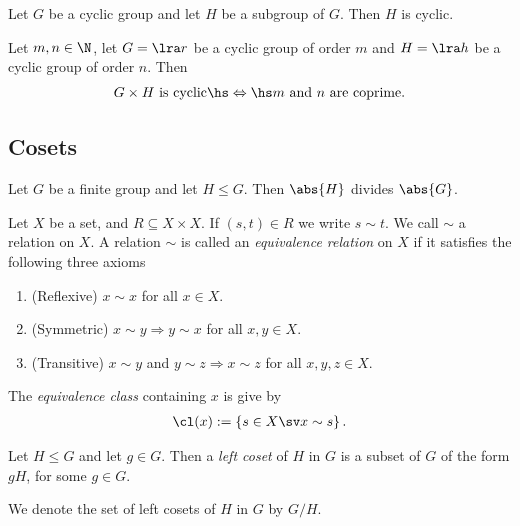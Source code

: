 \documentclass{article}
\begin{document}
\begin{theorem}
	Let $G$ be a cyclic group and let $H$ be a subgroup of $G$. Then
	$H$ is cyclic.
\end{theorem}

\begin{theorem}
	Let $m,n\in\N$, let $G=\lra r$ be a cyclic group of order $m$
	and $H=\lra h$ be a cyclic group of order $n$. Then
	\begin{align*}
		\text{$G\times H$ is cyclic} \hs\Leftrightarrow\hs \text{$m$ and $n$ are coprime.}
	\end{align*}
\end{theorem}

\subsection{Cosets}

\begin{theorem}
	Let $G$ be a finite group and let $H\leq G$.
	Then $\abs{H}$ divides $\abs{G}$.
\end{theorem}

\begin{definition}
	Let $X$ be a set, and $R\subseteq X\times X$.
	If $(s,t)\in R$ we write $s\sim t$. We call $\sim$
	a relation on $X$. A relation $\sim$ is called an
	\emph{equivalence relation} on $X$ if it satisfies
	the following three axioms
	\begin{enumerate}[label=E\arabic*.]
		\item (Reflexive) $x\sim x$ for all $x\in X$.
		\item (Symmetric) $x\sim y \Rightarrow y\sim x$ for all $x,y\in X$.
		\item (Transitive) $x\sim y$ and $y\sim z \Rightarrow x\sim z$ for all $x,y,z\in X$.
	\end{enumerate}
	The \emph{equivalence class} containing $x$ is give by
	\begin{align*}
		\cl(x) := \left\{s\in X \sv x\sim s\right\}.
	\end{align*}
\end{definition}

\setcounter{theorem}{3}
\begin{definition}
	Let $H\leq G$ and let $g\in G$. Then a \emph{left coset} of $H$
	in $G$ is a subset of $G$ of the form $gH$, for some $g\in G$.
\end{definition}

\setcounter{theorem}{5}
\begin{definition}
	We denote the set of left cosets of $H$ in $G$ by $G/H$.
\end{definition}
\end{document}
